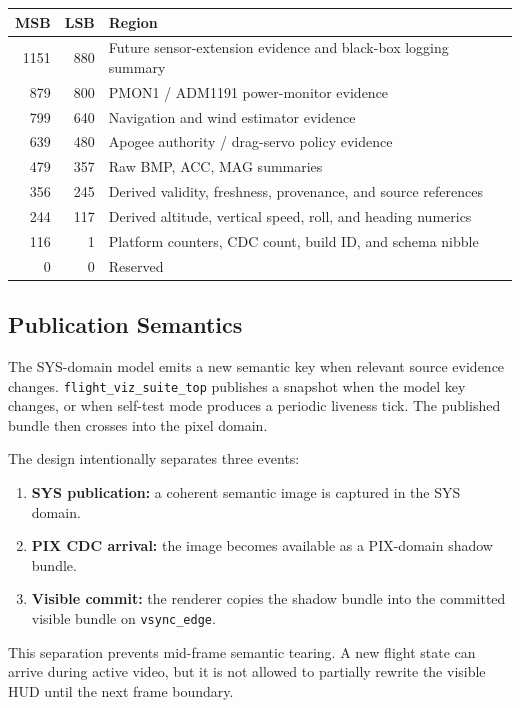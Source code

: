 \documentclass{article}
\newcommand{\sig}[1]{\begingroup\nolinkurl{#1}\endgroup}
\newcommand{\file}[1]{\begingroup\nolinkurl{#1}\endgroup}
\begin{document}
\begin{center}
\begin{tabular}{r r l}
\toprule
\textbf{MSB} & \textbf{LSB} & \textbf{Region} \\
\midrule
1151 & 880 & Future sensor-extension evidence and black-box logging summary \\
879  & 800 & PMON1 / ADM1191 power-monitor evidence \\
799  & 640 & Navigation and wind estimator evidence \\
639  & 480 & Apogee authority / drag-servo policy evidence \\
479  & 357 & Raw BMP, ACC, MAG summaries \\
356  & 245 & Derived validity, freshness, provenance, and source references \\
244  & 117 & Derived altitude, vertical speed, roll, and heading numerics \\
116  & 1   & Platform counters, CDC count, build ID, and schema nibble \\
0    & 0   & Reserved \\
\bottomrule
\end{tabular}
\end{center}

\subsection{Publication Semantics}

The SYS-domain model emits a new semantic key when relevant source evidence
changes.  \file{flight_viz_suite_top} publishes a snapshot when the model key
changes, or when self-test mode produces a periodic liveness tick.  The
published bundle then crosses into the pixel domain.

The design intentionally separates three events:

\begin{enumerate}
  \item \textbf{SYS publication:} a coherent semantic image is captured in the
        SYS domain.
  \item \textbf{PIX CDC arrival:} the image becomes available as a PIX-domain
        shadow bundle.
  \item \textbf{Visible commit:} the renderer copies the shadow bundle into the
        committed visible bundle on \sig{vsync_edge}.
\end{enumerate}

This separation prevents mid-frame semantic tearing.  A new flight state can
arrive during active video, but it is not allowed to partially rewrite the
visible HUD until the next frame boundary.
\end{document}
